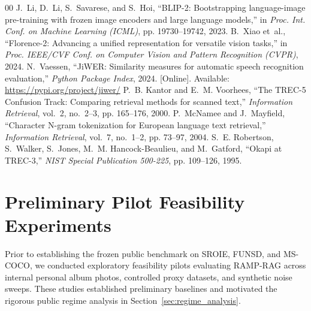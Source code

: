 \documentclass[conference]{IEEEtran}
\begin{document}
\begin{thebibliography}{00}
J.~Li, D.~Li, S.~Savarese, and S.~Hoi, ``BLIP-2: Bootstrapping language-image pre-training with frozen image encoders and large language models,'' in \emph{Proc. Int. Conf. on Machine Learning (ICML)}, pp. 19730--19742, 2023.
B.~Xiao et~al., ``Florence-2: Advancing a unified representation for versatile vision tasks,'' in \emph{Proc. IEEE/CVF Conf. on Computer Vision and Pattern Recognition (CVPR)}, 2024.
N.~Vaessen, ``JiWER: Similarity measures for automatic speech recognition evaluation,'' \emph{Python Package Index}, 2024. [Online]. Available: \url{https://pypi.org/project/jiwer/}
P.~B. Kantor and E.~M. Voorhees, ``The TREC-5 Confusion Track: Comparing retrieval methods for scanned text,'' \emph{Information Retrieval}, vol.~2, no.~2--3, pp. 165--176, 2000.
P.~McNamee and J.~Mayfield, ``Character N-gram tokenization for European language text retrieval,'' \emph{Information Retrieval}, vol.~7, no.~1--2, pp. 73--97, 2004.
S.~E. Robertson, S.~Walker, S.~Jones, M.~M. Hancock-Beaulieu, and M.~Gatford, ``Okapi at TREC-3,'' \emph{NIST Special Publication 500-225}, pp. 109--126, 1995.
\end{thebibliography}


\appendices

\section{Preliminary Pilot Feasibility Experiments}
\label{sec:appendix_pilot}
Prior to establishing the frozen public benchmark on SROIE, FUNSD, and MS-COCO, we conducted exploratory feasibility pilots evaluating RAMP-RAG across internal personal album photos, controlled proxy datasets, and synthetic noise sweeps. These studies established preliminary baselines and motivated the rigorous public regime analysis in Section~\ref{sec:regime_analysis}.
\end{document}
